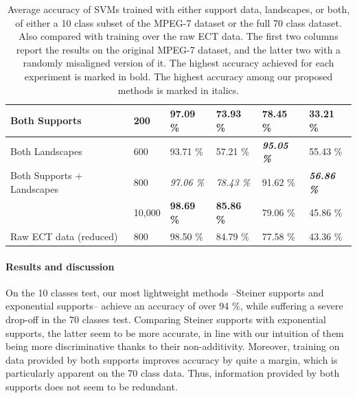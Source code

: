 \documentclass[a4paper]{article}
\begin{document}
\begin{table}[]
\begin{tabular}{l|l|l|l|l|l|}
		\multicolumn{1}{|l|}{Both Supports}                & 200                                                         & 97.09 \%          & 73.93 \%          & 78.45 \%                                                          & 33.21 \%                                                          \\ \hline
		\multicolumn{1}{|l|}{Both Landscapes}              & 600                                                         & 93.71 \%          & 57.21 \%          & \textit{\textbf{95.05 \%}}                                        & 55.43 \%                                                          \\ \hline
		\multicolumn{1}{|l|}{Both Supports + Landscapes}   & 800                                                         & \textit{97.06 \%} & \textit{78.43 \%} & 91.62 \%                                                          & \textit{\textbf{56.86 \%}}                                        \\ \hhline{|=|=|=|=|=|=|}
		\multicolumn{1}{|l|}{Raw ECT data}                 & 10,000                                                      & \textbf{98.69 \%} & \textbf{85.86 \%} & 79.06 \%                                                          & 45.86 \%                                                          \\ \hline
		\multicolumn{1}{|l|}{Raw ECT data (reduced)}       & 800                                                         & 98.50 \%          & 84.79 \%          & 77.58 \%                                                          & 43.36 \%                                                          \\ \hline
	\end{tabular}
	\caption{Average accuracy of SVMs trained with either support data, landscapes, or both, of either a 10 class subset of the MPEG-7 dataset or the full 70 class dataset. Also compared with training over the raw ECT data. The first two columns report the results on the original MPEG-7 dataset, and the latter two with a randomly misaligned version of it. The highest accuracy achieved for each experiment is marked in bold. The highest accuracy among our proposed methods is marked in italics. }
	\label{AccTable}
\end{table}

\paragraph{Results and discussion} On the 10 classes test, our most lightweight methods --Steiner supports and exponential supports-- achieve an accuracy of over 94 \%, while suffering a severe drop-off in the 70 classes test. Comparing Steiner supports with exponential supports, the latter seem to be more accurate, in line with our intuition of them being more discriminative thanks to their non-additivity. Moreover, training on data provided by both supports improves accuracy by quite a margin, which is particularly apparent on the 70 class data. Thus, information provided by both supports does not seem to be redundant.
\end{document}
